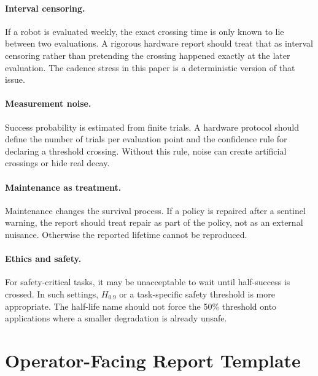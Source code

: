 \documentclass{article}
\newcommand{\life}[1]{H_{#1}}
\begin{document}
\paragraph{Interval censoring.}
If a robot is evaluated weekly, the exact crossing time is only known to lie
between two evaluations. A rigorous hardware report should treat that as
interval censoring rather than pretending the crossing happened exactly at the
later evaluation. The cadence stress in this paper is a deterministic version
of that issue.

\paragraph{Measurement noise.}
Success probability is estimated from finite trials. A hardware protocol should
define the number of trials per evaluation point and the confidence rule for
declaring a threshold crossing. Without this rule, noise can create artificial
crossings or hide real decay.

\paragraph{Maintenance as treatment.}
Maintenance changes the survival process. If a policy is repaired after a
sentinel warning, the report should treat repair as part of the policy, not as
an external nuisance. Otherwise the reported lifetime cannot be reproduced.

\paragraph{Ethics and safety.}
For safety-critical tasks, it may be unacceptable to wait until half-success is
crossed. In such settings, $\life{0.9}$ or a task-specific safety threshold is
more appropriate. The half-life name should not force the 50\% threshold onto
applications where a smaller degradation is already unsafe.

\section{Operator-Facing Report Template}
\end{document}
